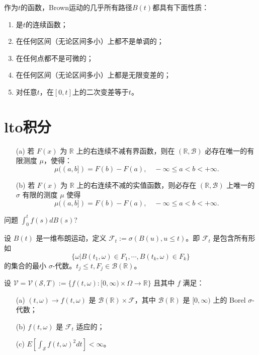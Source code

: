 \documentclass[lang=cn,10pt,thmcnt=section]{elegantbook}
\begin{document}
作为\( t \)的函数，Brown运动的几乎所有路径\( B(t) \)都具有下面性质：

\begin{enumerate}
    \item 是\( t \)的连续函数；
    \item 在任何区间（无论区间多小）上都不是单调的；
    \item 在任何点都不是可微的；
    \item 在任何区间（无论区间多小）上都是无限变差的；
    \item 对任意\( t \)，在\( [0, t] \)上的二次变差等于\( t \)。
\end{enumerate}

\section{lto积分}
\begin{theorem}
	\begin{enumerate}
		\item[(a)] 若 \( F(x) \) 为 \( \mathbb{R} \) 上的右连续不减有界函数，则在 \( (\mathbb{R}, \mathscr{B}) \) 必存在唯一的有限测度 \( \mu \)，使得：
		\[
		\mu((a,b]) = F(b) - F(a), \quad -\infty \leq a < b < +\infty.
		\]
		\item[(b)] 若 \( F(x) \) 为 \( \mathbb{R} \) 上的右连续不减的实值函数，则必存在 \( (\mathbb{R}, \mathscr{B}) \) 上唯一的 \( \sigma \) 有限的测度 \( \mu \) 使得
		\[
		\mu((a,b]) = F(b) - F(a), \quad -\infty \leq a < b < +\infty.
		\]
	\end{enumerate}
\end{theorem}
问题 \(\int_0^t f(s) dB(s)\)?
\begin{definition}
	设 \( B(t) \) 是一维布朗运动，定义 \( \mathcal{F}_t := \sigma(B(u), u \leq t) \)。即 \( \mathcal{F}_t \) 是包含所有形如
\[
\{\omega | B(t_1, \omega) \in F_1, \cdots, B(t_k, \omega) \in F_k\}
\]
的集合的最小 \(\sigma\)-代数。\( t_j \leq t, F_j \in \mathcal{B}(\mathbb{R}) \)。
\end{definition}
\begin{definition}
	设 \( \mathcal{V} = \mathcal{V}(\mathcal{S}, T) := \{f(t, \omega) : [0, \infty) \times \Omega \rightarrow \mathbb{R}\} \) 且其中 \( f \) 满足：
\begin{enumerate}
    \item[(a)] \( (t, \omega) \rightarrow f(t, \omega) \) 是 \( \mathcal{B}(\mathbb{R}) \times \mathcal{F} \)，其中 \( \mathcal{B}(\mathbb{R}) \) 是 \([0, \infty)\) 上的 Borel \(\sigma\)-代数；
    \item[(b)] \( f(t, \omega) \) 是 \( \mathcal{F}_t \) 适应的；
    \item[(c)] \( E\left[\int_{\mathcal{S}} f(t, \omega)^2 dt\right] < \infty \)。
\end{enumerate}
\end{definition}
\end{document}
